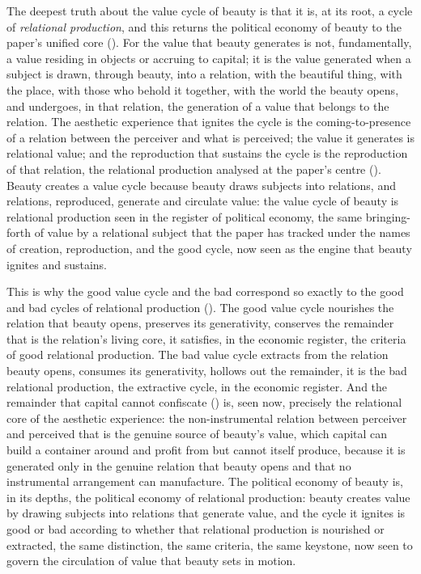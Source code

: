 The deepest truth about the value cycle of beauty is that it is, at its root, a cycle of \emph{relational production}, and this returns the political economy of beauty to the paper's unified core (). For the value that beauty generates is not, fundamentally, a value residing in objects or accruing to capital; it is the value generated when a subject is drawn, through beauty, into a relation, with the beautiful thing, with the place, with those who behold it together, with the world the beauty opens, and undergoes, in that relation, the generation of a value that belongs to the relation. The aesthetic experience that ignites the cycle is the coming-to-presence of a relation between the perceiver and what is perceived; the value it generates is relational value; and the reproduction that sustains the cycle is the reproduction of that relation, the relational production analysed at the paper's centre (). Beauty creates a value cycle because beauty draws subjects into relations, and relations, reproduced, generate and circulate value: the value cycle of beauty is relational production seen in the register of political economy, the same bringing-forth of value by a relational subject that the paper has tracked under the names of creation, reproduction, and the good cycle, now seen as the engine that beauty ignites and sustains.

This is why the good value cycle and the bad correspond so exactly to the good and bad cycles of relational production (). The good value cycle nourishes the relation that beauty opens, preserves its generativity, conserves the remainder that is the relation's living core, it satisfies, in the economic register, the criteria of good relational production. The bad value cycle extracts from the relation beauty opens, consumes its generativity, hollows out the remainder, it is the bad relational production, the extractive cycle, in the economic register. And the remainder that capital cannot confiscate () is, seen now, precisely the relational core of the aesthetic experience: the non-instrumental relation between perceiver and perceived that is the genuine source of beauty's value, which capital can build a container around and profit from but cannot itself produce, because it is generated only in the genuine relation that beauty opens and that no instrumental arrangement can manufacture. The political economy of beauty is, in its depths, the political economy of relational production: beauty creates value by drawing subjects into relations that generate value, and the cycle it ignites is good or bad according to whether that relational production is nourished or extracted, the same distinction, the same criteria, the same keystone, now seen to govern the circulation of value that beauty sets in motion.

